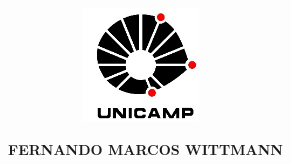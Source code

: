 
\newpage

\thispagestyle{plain}

\includegraphics[width=7cm, height=3cm,keepaspectratio=true]{imgs/logo}
\begin{center}
  {
  \large\textbf{\textsc{FERNANDO MARCOS WITTMANN}}
  
  }
\end{center}




\vspace{.5cm}

\begin{center}
  {\large\textbf{\textsc{\titulobr}}}
\end{center}


\begin{center}
  {\large\textbf{\textsc{\titulo}}}
\end{center}

\vfill

